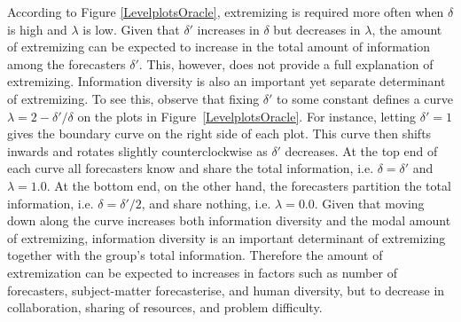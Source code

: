 \documentclass[11pt]{article}
\newtheorem{observation}[theorem]{Observation}
\theoremstyle{definition}
\theoremstyle{definition}
\begin{document}
According to Figure \ref{LevelplotsOracle}, extremizing is required 
more often when $\delta$ is high and $\lambda$ is low.  Given that 
$\delta'$ increases in $\delta$ but decreases in $\lambda$, the amount 
of extremizing can be expected to increase in the total amount of 
information among the forecasters $\delta'$.  This, however, does not 
provide a full explanation of extremizing.  Information diversity 
is also an important yet separate determinant of extremizing.  
To see this, observe that fixing $\delta'$ to some constant 
defines a curve $\lambda = 2 - \delta'/\delta$ on the plots in 
Figure~\ref{LevelplotsOracle}.  For instance, letting $\delta' = 1$ 
gives the boundary curve on the right side of each plot.  This curve 
then shifts inwards and rotates slightly counterclockwise as 
$\delta'$ decreases.  At the top end of each curve all forecasters 
know and share the total information, i.e. $\delta = \delta'$ and 
$\lambda = 1.0$.  At the bottom end, on the other hand, the forecasters 
partition the total information, i.e. $\delta = \delta'/2$, and 
share nothing, i.e. $\lambda = 0.0$.  Given that moving down along 
the curve increases both information diversity and the modal amount 
of extremizing, information diversity is an important determinant 
of extremizing together with the group's total information.  
Therefore the amount of extremization can be expected to increases in factors such as number of forecasters, subject-matter forecasterise, and human diversity, but to decrease in collaboration, sharing of resources, and problem difficulty.

\end{document}
